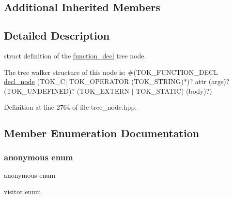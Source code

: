 \subsection*{Additional Inherited Members}


\subsection{Detailed Description}
struct definition of the \hyperlink{structfunction__decl}{function\+\_\+decl} tree node. 

The tree walker structure of this node is\+: \#(T\+O\+K\+\_\+\+F\+U\+N\+C\+T\+I\+O\+N\+\_\+\+D\+E\+CL \hyperlink{structdecl__node}{decl\+\_\+node} (T\+O\+K\+\_\+\+C$\vert$ T\+O\+K\+\_\+\+O\+P\+E\+R\+A\+T\+OR (T\+O\+K\+\_\+\+S\+T\+R\+I\+NG)$\ast$)? attr (args)? (T\+O\+K\+\_\+\+U\+N\+D\+E\+F\+I\+N\+ED)? (T\+O\+K\+\_\+\+E\+X\+T\+E\+RN $\vert$ T\+O\+K\+\_\+\+S\+T\+A\+T\+IC) (body)?) 

Definition at line 2764 of file tree\+\_\+node.\+hpp.



\subsection{Member Enumeration Documentation}
\mbox{\label{structfunction__decl_a18d627c0b2293ae1ca973fd86b1e9ca7}} 
\subsubsection{\texorpdfstring{anonymous enum}{anonymous enum}}
{\footnotesize\ttfamily anonymous enum}



visitor enum 

